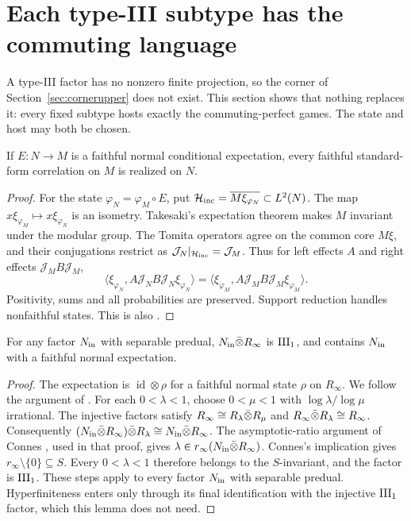 
\section{Each type-III subtype has the commuting language}\label{sec:typeIII}
A type-III factor has no nonzero finite projection, so the corner of Section~\ref{sec:cornerupper} does not exist. This section shows that nothing replaces it: every fixed subtype hosts exactly the commuting-perfect games. The state and host may both be chosen.

\begin{backgroundlemma}
If $E:N\to M$ is a faithful normal conditional expectation, every
faithful standard-form correlation on $M$ is realized on $N$.
\end{backgroundlemma}
\begin{proof}
For the state $\varphi_N=\varphi_M\circ E$, put
$\mathcal H_{\rm inc}=\overline{M\xi_{\varphi_N}}\subset L^2(N)$.
The map $x\xi_{\varphi_M}\mapsto x\xi_{\varphi_N}$ is an isometry.
Takesaki's expectation theorem \cite{Takesaki} makes $M$ invariant
under the modular group. The Tomita operators agree on the common
core $M\xi$, and their conjugations restrict as $\mathcal J_N|_{\mathcal H_{\rm inc}}=\mathcal J_M$.
Thus for left effects $A$ and right effects $\mathcal J_MB\mathcal J_M$,
\[
 \langle\xi_{\varphi_N},A \mathcal J_NB\mathcal J_N\xi_{\varphi_N}\rangle
 =\langle\xi_{\varphi_M},A \mathcal J_MB\mathcal J_M\xi_{\varphi_M}\rangle.
\]
Positivity, sums and all probabilities are preserved. Support
reduction handles nonfaithful states. This is also
\cite[Lemma 3.1]{ReadType}.
\end{proof}

\begin{lemma}\label{lem:absorb}
For any factor $N_{\rm in}$ with separable predual, $N_{\rm in}\bar\otimes R_\infty$ is
$\mathrm{III}_1$, and contains $N_{\rm in}$ with a faithful normal expectation.
\end{lemma}
\begin{proof}
The expectation is $\operatorname{id}\otimes\rho$ for a faithful normal
state $\rho$ on $R_\infty$.
We follow the argument of \cite[Lemma 3.8]{HM}.
For each $0<\lambda<1$, choose $0<\mu<1$ with
$\log\lambda/\log\mu$ irrational.
The injective factors satisfy
$R_\infty\cong R_\lambda\bar\otimes R_\mu$ and
$R_\infty\bar\otimes R_\lambda\cong R_\infty$.
Consequently $(N_{\rm in}\bar\otimes R_\infty)\bar\otimes R_\lambda
\cong N_{\rm in}\bar\otimes R_\infty$.
The asymptotic-ratio argument of Connes \cite[Section 3.6]{Connes}, used in that proof, gives
$\lambda\in r_\infty(N_{\rm in}\bar\otimes R_\infty)$.
Connes's implication \cite[Theorem 3.6.1]{Connes} gives
$r_\infty\setminus\{0\}\subseteq S$.
Every $0<\lambda<1$ therefore belongs to the $S$-invariant, and the
factor is $\mathrm{III}_1$. These steps apply to every factor $N_{\rm in}$ with
separable predual. Hyperfiniteness enters \cite[Lemma 3.8]{HM} only
through its final identification with the injective $\mathrm{III}_1$ factor,
which this lemma does not need.
\end{proof}

